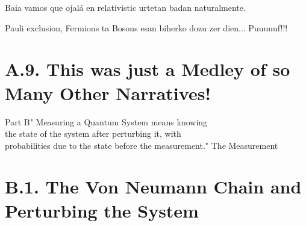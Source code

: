 \documentclass[11pt, a4paper]{article} %
\begin{document}
Baia vamos que ojalá en relativistic urtetan badan naturalmente.

Pauli exclusion, Fermions ta Bosons esan biherko dozu zer dien... Puuuuuf!!!
\fi

\section*{A.9. This was just a Medley of so Many Other Narratives!}

\newpage

\newpage

\begin{kapituloBerria}{Part B}{" Measuring a Quantum System means knowing\\ the state of the system after perturbing it, with\\ probabilities due to the state before the measurement."}
The Measurement 
\end{kapituloBerria}
\newpage
\fancyhead[L]{\null}
\fancyhead[R]{\null}
\null
\clearpage


\section*{B.1. The Von Neumann Chain and Perturbing the System}

\end{document}

